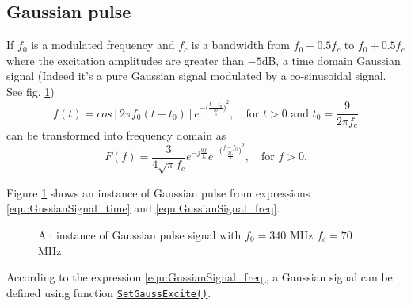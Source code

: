     \subsection{Gaussian pulse} \label{subsec:Gaussian pulse}
If $f_0$ is a modulated frequency and $f_c$ is a bandwidth  from   $f_0-0.5f_c$ to  $f_0+0.5f_c$ where the excitation amplitudes  are greater than $-5$dB, a time domain Gaussian signal (Indeed it's a pure Gaussian signal modulated by a co-sinusoidal signal. See fig. \ref{fig:GaussInpulseTheory})
\begin{equation}\label{equ:GussianSignal_time}
 f(t)=cos[2\pi f_0(t-t_0)]e^{-{\big(\frac{t-t_0}{\frac{t0}{3}}\big)}^2}, \quad \text{for } t>0 \text{ and }t_0=\frac{9}{2\pi f_c}
\end{equation}
can be transformed  into frequency domain as
\begin{equation}\label{equ:GussianSignal_freq}
F(f)=\frac{3}{4\sqrt{\pi}f_c}e^{-j\frac{9f}{f_c}}e^{-{\big(\frac{f-f_0}{\frac{2f_c}{3}}\big)}^2},\quad \text{for } f>0 .
\end{equation}

Figure \ref{fig:GaussInpulseTheory} shows an instance of Gaussian pulse from expressions \ref{equ:GussianSignal_time} and \ref{equ:GussianSignal_freq}. 
    \begin{figure}[hbt]
	      \centering
	      \caption[Gaussian pulse signal]{An instance of Gaussian pulse signal with $f_0=340$ MHz $f_c=70$ MHz}
	      \label{fig:GaussInpulseTheory}
    \end{figure}
According to the expression \ref{equ:GussianSignal_freq}, a Gaussian signal can be defined using function \hyperref[func:SetGaussExcite]{\texttt{SetGaussExcite()}}.

